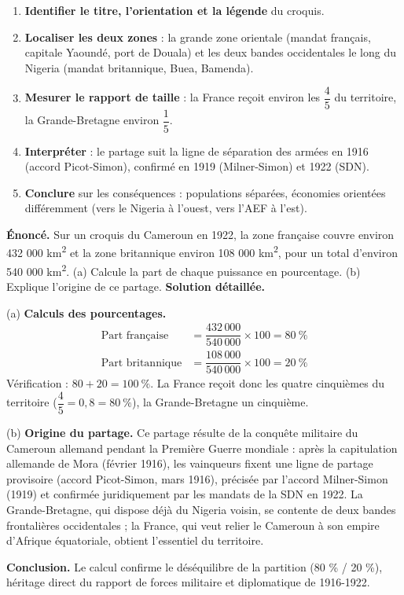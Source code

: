 \documentclass[11pt]{article}
\begin{document}
\begin{methode}
\begin{enumerate}
\item \textbf{Identifier le titre, l'orientation et la légende} du croquis.
\item \textbf{Localiser les deux zones} : la grande zone orientale (mandat français, capitale Yaoundé, port de Douala) et les deux bandes occidentales le long du Nigeria (mandat britannique, Buea, Bamenda).
\item \textbf{Mesurer le rapport de taille} : la France reçoit environ les $\dfrac{4}{5}$ du territoire, la Grande-Bretagne environ $\dfrac{1}{5}$.
\item \textbf{Interpréter} : le partage suit la ligne de séparation des armées en 1916 (accord Picot-Simon), confirmé en 1919 (Milner-Simon) et 1922 (SDN).
\item \textbf{Conclure} sur les conséquences : populations séparées, économies orientées différemment (vers le Nigeria à l'ouest, vers l'AEF à l'est).
\end{enumerate}
\end{methode}

\begin{exoresolu}
\textbf{Énoncé.} Sur un croquis du Cameroun en 1922, la zone française couvre environ 432 000 km\textsuperscript{2} et la zone britannique environ 108 000 km\textsuperscript{2}, pour un total d'environ 540 000 km\textsuperscript{2}. (a) Calcule la part de chaque puissance en pourcentage. (b) Explique l'origine de ce partage.
\tcblower
\textbf{Solution détaillée.}

(a) \textbf{Calculs des pourcentages.}
\begin{align*}
\text{Part française} &= \dfrac{432\,000}{540\,000} \times 100 = 80\ \% \\
\text{Part britannique} &= \dfrac{108\,000}{540\,000} \times 100 = 20\ \%
\end{align*}
Vérification : $80 + 20 = 100\ \%$. La France reçoit donc les quatre cinquièmes du territoire ($\dfrac{4}{5} = 0,8 = 80\ \%$), la Grande-Bretagne un cinquième.

(b) \textbf{Origine du partage.} Ce partage résulte de la conquête militaire du Cameroun allemand pendant la Première Guerre mondiale : après la capitulation allemande de Mora (février 1916), les vainqueurs fixent une ligne de partage provisoire (accord Picot-Simon, mars 1916), précisée par l'accord Milner-Simon (1919) et confirmée juridiquement par les mandats de la SDN en 1922. La Grande-Bretagne, qui dispose déjà du Nigeria voisin, se contente de deux bandes frontalières occidentales ; la France, qui veut relier le Cameroun à son empire d'Afrique équatoriale, obtient l'essentiel du territoire.

\textbf{Conclusion.} Le calcul confirme le déséquilibre de la partition (80 \% / 20 \%), héritage direct du rapport de forces militaire et diplomatique de 1916-1922.
\end{exoresolu}
\end{document}
